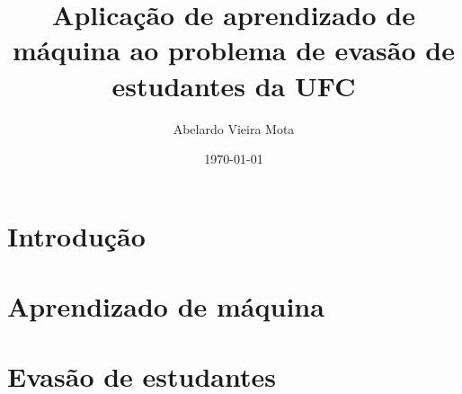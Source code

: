 \documentclass[a4paper]{article}
\title{Aplicação de aprendizado de máquina ao problema de evasão de estudantes da UFC}
\author{Abelardo Vieira Mota}
\date{\today}
\begin{document}
\maketitle

\begin{abstract}

\end{abstract}

\listoffigures
\tableofcontents


\section{Introdução}


\section{Aprendizado de máquina}


\section{Evasão de estudantes}



\end{document}
